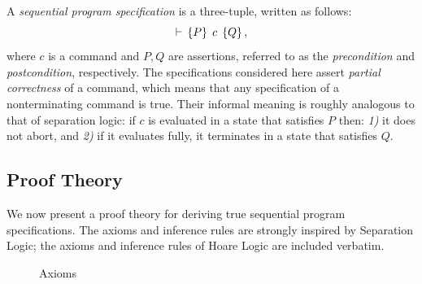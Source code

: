 \documentclass[11pt]{report}
\begin{document}
A \emph{sequential program specification} is a three-tuple, written as follows: \[ \vdash\,\left\lbrace P \right\rbrace\;c\;\left\lbrace Q \right\rbrace, \] where $c$ is a command and $P,Q$ are assertions, referred to as the \emph{precondition} and \emph{postcondition}, respectively. The specifications considered here assert \emph{partial correctness} of a command, which means that any specification of a nonterminating command is true. Their informal meaning is roughly analogous to that of separation logic: if $c$ is evaluated in a state that satisfies $P$ then: \emph{1)} it does not abort, and \emph{2)} if it evaluates fully, it terminates in a state that satisfies $Q$. 

\subsection{Proof Theory}
\label{sec:sequential-proof-theory}

We now present a proof theory for deriving true sequential program specifications. The axioms and inference rules are strongly inspired by Separation Logic; the axioms and inference rules of Hoare Logic are included verbatim. 

\begin{figure}[ht]
    \centering
    \caption{\label{fig:sequential-axioms}Axioms}
\end{figure}
\end{document}

